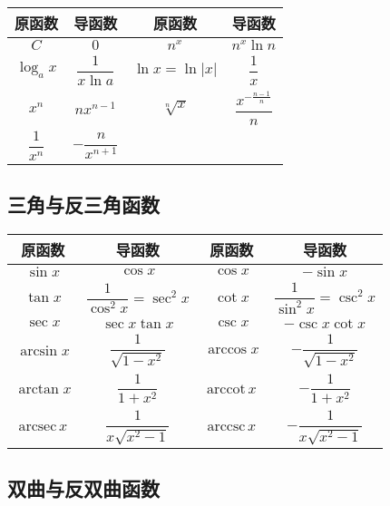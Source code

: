 \documentclass[UTF8, 12pt]{ctexart}
\begin{document}
\begin{center}
    \begin{tabular}{|c|c|c|c|}
        \hline
        原函数 & 导函数 & 原函数 & 导函数\\ \hline
        $C$ & $0$ & $n^x$ & $n^x\ln n$ \\ \hline
        $\log_ax$ & $\dfrac{1}{x\ln a}$ & $\ln x=\ln\vert x\vert$ & $\dfrac{1}{x}$ \\ \hline
        $x^n$ & $nx^{n-1}$ & $\sqrt[n]{x}$ & $\dfrac{x^{-\frac{n-1}{n}}}{n}$ \\ \hline
        $\dfrac{1}{x^n}$ & $-\dfrac{n}{x^{n+1}}$ & & \\
        \hline
    \end{tabular}
\end{center}

\subsection{三角与反三角函数}

\begin{center}
    \begin{tabular}{|c|c|c|c|}
        \hline
        原函数 & 导函数 & 原函数 & 导函数\\ \hline
        $\sin x$ & $\cos x$ & $\cos x$ & $-\sin x$ \\ \hline
        $\tan x$ & $\dfrac{1}{\cos^2x}=\sec^2x$ & $\cot x$ & $\dfrac{1}{\sin^2x}=\csc^2x$ \\ \hline
        $\sec x$ & $\sec x\tan x$ & $\csc x$ & $-\csc x\cot x$ \\ \hline
        $\arcsin x$ & $\dfrac{1}{\sqrt{1-x^2}}$ & $\arccos x$ & $-\dfrac{1}{\sqrt{1-x^2}}$ \\ \hline
        $\arctan x$ & $\dfrac{1}{1+x^2}$ & $\textrm{arccot}\,x$ & $-\dfrac{1}{1+x^2}$ \\ \hline
        $\textrm{arcsec}\,x$ & $\dfrac{1}{x\sqrt{x^2-1}}$ & $\textrm{arccsc}\,x$ & $-\dfrac{1}{x\sqrt{x^2-1}}$ \\
        \hline
    \end{tabular}
\end{center}

\subsection{双曲与反双曲函数}
\end{document}
